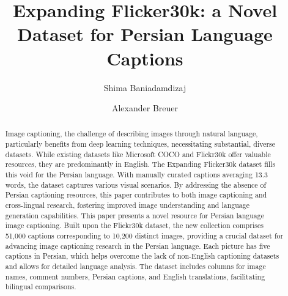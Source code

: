 \documentclass[runningheads]{llncs}
\begin{document}
%
\title{Expanding Flicker30k: a Novel Dataset for Persian Language Captions}
%
%
\author{Shima Baniadamdizaj \and
Alexander Breuer }
%
% 
%
\maketitle              %
%
\begin{abstract}
Image captioning, the challenge of describing images through natural language, particularly benefits from deep learning techniques, necessitating substantial, diverse datasets. While existing datasets like Microsoft COCO and Flickr30k offer valuable resources, they are predominantly in English. The Expanding Flicker30k dataset fills this void for the Persian language. With manually curated captions averaging 13.3 words, the dataset captures various visual scenarios. By addressing the absence of Persian captioning resources, this paper contributes to both image captioning and cross-lingual research, fostering improved image understanding and language generation capabilities.
This paper presents a novel resource for Persian language image captioning. Built upon the Flickr30k dataset, the new collection comprises 51,000 captions corresponding to 10,200 distinct images, providing a crucial dataset for advancing image captioning research in the Persian language. Each picture has five captions in Persian, which helps overcome the lack of non-English captioning datasets and allows for detailed language analysis. The dataset includes columns for image names, comment numbers, Persian captions, and English translations, facilitating bilingual comparisons.

\end{abstract}
%
%
%
\end{document}
